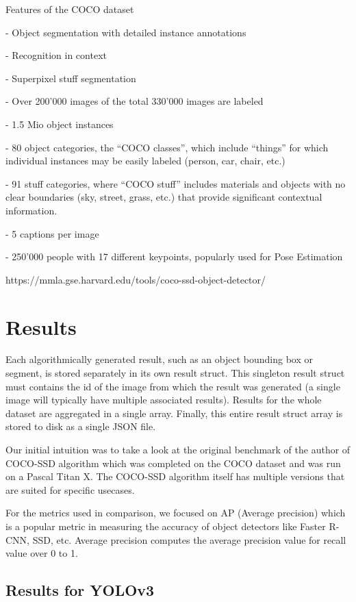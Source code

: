 \documentclass[runningheads,a4paper,11pt]{report}
\begin{document}
Features of the COCO dataset

    - Object segmentation with detailed instance annotations
    
    - Recognition in context
    
    - Superpixel stuff segmentation
    
    - Over 200’000 images of the total 330’000 images are labeled
    
    - 1.5 Mio object instances
    
    - 80 object categories, the “COCO classes”, which include “things” for which individual instances may be easily labeled (person, car, chair, etc.)
    
    - 91 stuff categories, where “COCO stuff” includes materials and objects with no clear boundaries (sky, street, grass, etc.) that provide significant contextual information.
    
    - 5 captions per image
    
    - 250’000 people with 17 different keypoints, popularly used for Pose Estimation


https://mmla.gse.harvard.edu/tools/coco-ssd-object-detector/


\section{Results}
\label{section:results}

Each algorithmically generated result, such as an object bounding box or segment, is stored separately in its own result struct. This singleton result struct must contains the id of the image from which the result was generated (a single image will typically have multiple associated results). Results for the whole dataset are aggregated in a single array. Finally, this entire result struct array is stored to disk as a single JSON file.

Our initial intuition was to take a look at the original benchmark of the author of COCO-SSD algorithm which was completed on the COCO dataset and was run on a Pascal Titan X. The COCO-SSD algorithm itself has multiple versions that are suited for specific usecases.

For the metrics used in comparison, we focused on AP (Average precision) which is a popular metric in measuring the accuracy of object detectors like Faster R-CNN, SSD, etc. Average precision computes the average precision value for recall value over 0 to 1. 

\subsection{Results for YOLOv3}
\label{subsection:results}
\end{document}
